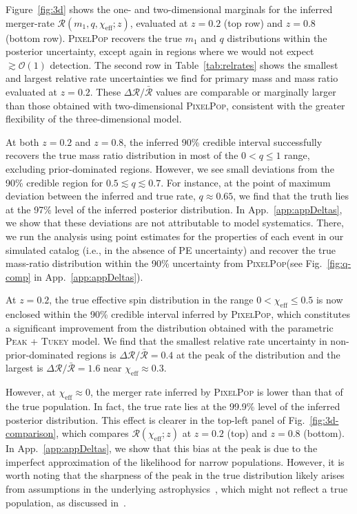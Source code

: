 \documentclass[twocolumn, twocolappendix]{aastex631}
\newcommand{\zone}{0.2}
\newcommand{\ztwo}{0.8}
\newcommand{\chieff}{\ensuremath{\chi_\mathrm{eff}}}
\newcommand{\relrate}{\Delta\mathcal{R}/\bar{\mathcal{R}}}
\newcommand{\PixelPop}{\textsc{PixelPop}\xspace}
\newcommand{\PeakTukey}{\textsc{Peak + Tukey}\xspace}
\begin{document}
Figure~\ref{fig:3d} shows the one- and two-dimensional marginals for the inferred merger-rate $\mathcal{R}(m_1, q,\chieff;z)$, evaluated at $z=\zone$ (top row) and $z=\ztwo$ (bottom row). \PixelPop recovers the true $m_1$ and $q$ distributions within the posterior uncertainty, except again in regions where we would not expect $\gtrsim\mathcal{O}(1)$ detection. The second row in Table~\ref{tab:relrates} shows the smallest and largest relative rate uncertainties we find for primary mass and mass ratio evaluated at $z=0.2$. These $\relrate$ values are comparable or marginally larger than those obtained with two-dimensional \PixelPop, consistent with the greater flexibility of the three-dimensional model.

At both $z=0.2$ and $z=0.8$, the inferred 90\% credible interval successfully recovers the true mass ratio distribution in most of the $0 < q \leq 1$ range, excluding prior-dominated regions. However, we see small deviations from the 90\% credible region for $0.5 \lesssim q \lesssim 0.7$. For instance, at the point of maximum deviation between the inferred and true rate, $q\approx0.65$, we find that the truth lies at the 97\% level of the inferred posterior distribution. In App.~\ref{app:appDeltas}, we show that these deviations are not attributable to model systematics. There, we run the analysis using point estimates for the properties of each event in our simulated catalog (i.e., in the absence of \ac{PE} uncertainty) and recover the true mass-ratio distribution within the 90\% uncertainty from \PixelPop (see Fig.~\ref{fig:q-comp} in App.~\ref{app:appDeltas}). 

At $z=0.2$, the true effective spin distribution in the range $0 < \chieff \leq 0.5$ is now enclosed within the 90\% credible interval inferred by \PixelPop, which constitutes a significant improvement from the distribution obtained with the parametric \PeakTukey model. We find that the smallest relative rate uncertainty in non-prior-dominated regions is $\relrate=0.4$ at the peak of the distribution and the largest is $\relrate=1.6$ near $\chieff\approx0.3$. 
 
However, at $\chieff\approx0$, the merger rate inferred by \PixelPop is lower than that of the true population. In fact, the true rate lies at the 99.9\% level of the inferred posterior distribution. This effect is clearer in the top-left panel of Fig.~\ref{fig:3d-comparison}, which compares $\mathcal{R}(\chieff;z)$ at $z=0.2$ (top) and $z=0.8$ (bottom). In App.~\ref{app:appDeltas}, we show that this bias at the peak is due to the imperfect approximation of the likelihood for narrow populations. However, it is worth noting that the sharpness of the peak in the true distribution likely arises from assumptions in the underlying astrophysics~\citep{Fuller:2019sxi}, which might not reflect a true population, as discussed in~\citet{Colloms:2025hib}.
\end{document}
